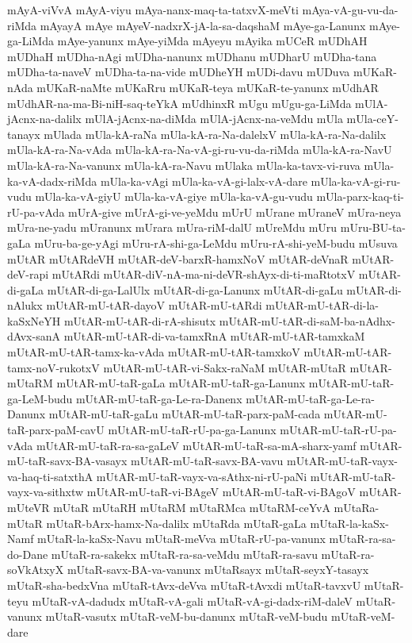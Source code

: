 {mAyA-viVvA
mAyA-viyu
mAya-nanx-maq-ta-tatxvX-meVti
mAya-vA-gu-vu-da-riMda
mAyayA
mAye
mAyeV-nadxrX-jA-la-sa-daqshaM
mAye-ga-Lanunx
mAye-ga-LiMda
mAye-yanunx
mAye-yiMda
mAyeyu
mAyika
mUCeR
mUDhAH
mUDhaH
mUDha-nAgi
mUDha-nanunx
mUDhanu
mUDharU
mUDha-tana
mUDha-ta-naveV
mUDha-ta-na-vide
mUDheYH
mUDi-davu
mUDuva
mUKaR-nAda
mUKaR-naMte
mUKaRru
mUKaR-teya
mUKaR-te-yanunx
mUdhAR
mUdhAR-na-ma-Bi-niH-saq-teYkA
mUdhinxR
mUgu
mUgu-ga-LiMda
mUlA-jAcnx-na-dalilx
mUlA-jAcnx-na-diMda
mUlA-jAcnx-na-veMdu
mUla
mUla-ceY-tanayx
mUlada
mUla-kA-raNa
mUla-kA-ra-Na-dalelxV
mUla-kA-ra-Na-dalilx
mUla-kA-ra-Na-vAda
mUla-kA-ra-Na-vA-gi-ru-vu-da-riMda
mUla-kA-ra-NavU
mUla-kA-ra-Na-vanunx
mUla-kA-ra-Navu
mUlaka
mUla-ka-tavx-vi-ruva
mUla-ka-vA-dadx-riMda
mUla-ka-vAgi
mUla-ka-vA-gi-lalx-vA-dare
mUla-ka-vA-gi-ru-vudu
mUla-ka-vA-giyU
mUla-ka-vA-giye
mUla-ka-vA-gu-vudu
mUla-parx-kaq-ti-rU-pa-vAda
mUrA-give
mUrA-gi-ve-yeMdu
mUrU
mUrane
mUraneV
mUra-neya
mUra-ne-yadu
mUranunx
mUrara
mUra-riM-dalU
mUreMdu
mUru
mUru-BU-ta-gaLa
mUru-ba-ge-yAgi
mUru-rA-shi-ga-LeMdu
mUru-rA-shi-yeM-budu
mUsuva
mUtAR
mUtARdeVH
mUtAR-deV-barxR-hamxNoV
mUtAR-deVnaR
mUtAR-deV-rapi
mUtARdi
mUtAR-diV-nA-ma-ni-deVR-shAyx-di-ti-maRtotxV
mUtAR-di-gaLa
mUtAR-di-ga-LalUlx
mUtAR-di-ga-Lanunx
mUtAR-di-gaLu
mUtAR-di-nAlukx
mUtAR-mU-tAR-dayoV
mUtAR-mU-tARdi
mUtAR-mU-tAR-di-la-kaSxNeYH
mUtAR-mU-tAR-di-rA-shisutx
mUtAR-mU-tAR-di-saM-ba-nAdhx-dAvx-sanA
mUtAR-mU-tAR-di-va-tamxRnA
mUtAR-mU-tAR-tamxkaM
mUtAR-mU-tAR-tamx-ka-vAda
mUtAR-mU-tAR-tamxkoV
mUtAR-mU-tAR-tamx-noV-rukotxV
mUtAR-mU-tAR-vi-Sakx-raNaM
mUtAR-mUtaR
mUtAR-mUtaRM
mUtAR-mU-taR-gaLa
mUtAR-mU-taR-ga-Lanunx
mUtAR-mU-taR-ga-LeM-budu
mUtAR-mU-taR-ga-Le-ra-Danenx
mUtAR-mU-taR-ga-Le-ra-Danunx
mUtAR-mU-taR-gaLu
mUtAR-mU-taR-parx-paM-cada
mUtAR-mU-taR-parx-paM-cavU
mUtAR-mU-taR-rU-pa-ga-Lanunx
mUtAR-mU-taR-rU-pa-vAda
mUtAR-mU-taR-ra-sa-gaLeV
mUtAR-mU-taR-sa-mA-sharx-yamf
mUtAR-mU-taR-savx-BA-vasayx
mUtAR-mU-taR-savx-BA-vavu
mUtAR-mU-taR-vayx-va-haq-ti-satxthA
mUtAR-mU-taR-vayx-va-sAthx-ni-rU-paNi
mUtAR-mU-taR-vayx-va-sithxtw
mUtAR-mU-taR-vi-BAgeV
mUtAR-mU-taR-vi-BAgoV
mUtAR-mUteVR
mUtaR
mUtaRH
mUtaRM
mUtaRMca
mUtaRM-ceYvA
mUtaRa-mUtaR
mUtaR-bArx-hamx-Na-dalilx
mUtaRda
mUtaR-gaLa
mUtaR-la-kaSx-Namf
mUtaR-la-kaSx-Navu
mUtaR-meVva
mUtaR-rU-pa-vanunx
mUtaR-ra-sa-do-Dane
mUtaR-ra-sakekx
mUtaR-ra-sa-veMdu
mUtaR-ra-savu
mUtaR-ra-soVkAtxyX
mUtaR-savx-BA-va-vanunx
mUtaRsayx
mUtaR-seyxY-tasayx
mUtaR-sha-bedxVna
mUtaR-tAvx-deVva
mUtaR-tAvxdi
mUtaR-tavxvU
mUtaR-teyu
mUtaR-vA-dadudx
mUtaR-vA-gali
mUtaR-vA-gi-dadx-riM-daleV
mUtaR-vanunx
mUtaR-vasutx
mUtaR-veM-bu-danunx
mUtaR-veM-budu
mUtaR-veM-dare
}
